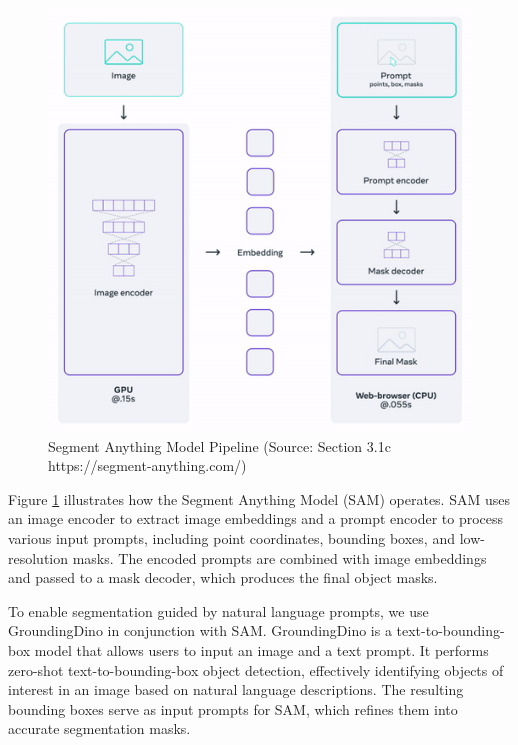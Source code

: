 \begin{figure}[H]
    \centering
    \includegraphics[scale=0.5]{graphs/SAM.jpg}
    \caption{Segment Anything Model Pipeline (Source: Section 3.1c https://segment-anything.com/)}
    \label{fig:SAM}
\end{figure}

Figure \ref{fig:SAM} illustrates how the Segment Anything Model (SAM) operates. SAM uses an image encoder to extract image embeddings and a prompt encoder to process various input prompts, including point coordinates, bounding boxes, and low-resolution masks. The encoded prompts are combined with image embeddings and passed to a mask decoder, which produces the final object masks.

To enable segmentation guided by natural language prompts, we use GroundingDino in conjunction with SAM. GroundingDino is a text-to-bounding-box model that allows users to input an image and a text prompt. It performs zero-shot text-to-bounding-box object detection, effectively identifying objects of interest in an image based on natural language descriptions. The resulting bounding boxes serve as input prompts for SAM, which refines them into accurate segmentation masks.


